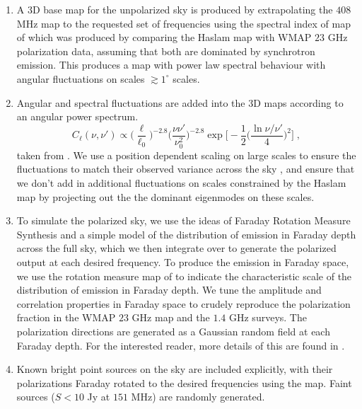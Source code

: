 \begin{enumerate}[label=(\roman*)]
 \item A 3D base map for the unpolarized sky is produced by extrapolating the $408$ MHz \cite{HaslamMap} map to the requested set of frequencies using 
    the spectral index of map of \cite{MD2008} which     was produced by comparing the Haslam map with WMAP $23$ GHz polarization data, assuming that both are dominated by 
    synchrotron emission. This produces a map with power law spectral behaviour with angular fluctuations on scales $\gtrsim 1^\circ$ scales.

    \item Angular and spectral fluctuations are added into the 3D maps according to an angular power spectrum.
    \begin{equation}
        C_\ell(\nu, \nu') \propto \biggl(\frac{\ell}{\ell_0}\biggr)^{-2.8} \biggl(\frac{\nu \nu'}{\nu_0^2}\biggr)^{-2.8} \exp{\Biggl[- \frac{1}{2} \biggl(\frac{\ln{\nu / \nu'}}{4}\biggr)^2\Biggr]} \; ,
    \end{equation}
    taken from \cite{SantosCoorayKnox}. We use a position dependent scaling on large scales to ensure the fluctuations to match their observed variance across the sky
    \citep{LaPorta2008},
    and ensure that we don't add in additional fluctuations on scales constrained by the Haslam map by projecting out the the dominant eigenmodes on these scales.

    \item To simulate the polarized sky, we use the ideas of Faraday Rotation Measure Synthesis \citep{Brentjens2005} and a simple model of the distribution of emission in 
    Faraday depth across the full sky, which we then integrate over to generate the polarized output at each desired frequency. To produce the emission in Faraday space, 
    we use the rotation 
    measure map of \cite{Oppermann2012} to indicate the characteristic scale of the distribution of emission in Faraday depth. We tune the amplitude and correlation 
    properties in Faraday 
    space to crudely reproduce the polarization fraction in the WMAP $23$ GHz map and the $1.4$ GHz surveys. The polarization directions are generated as 
    a Gaussian random field at each
    Faraday depth. For the interested reader, more details of this are found in  \cite{shaw2015coaxing}.

    \item Known bright point sources on the sky are included explicitly, with their polarizations Faraday rotated to the desired frequencies using the \cite{Oppermann2012} map. 
    Faint sources ($S < 10$ Jy at $151$ MHz) are randomly generated.
\end{enumerate} 


